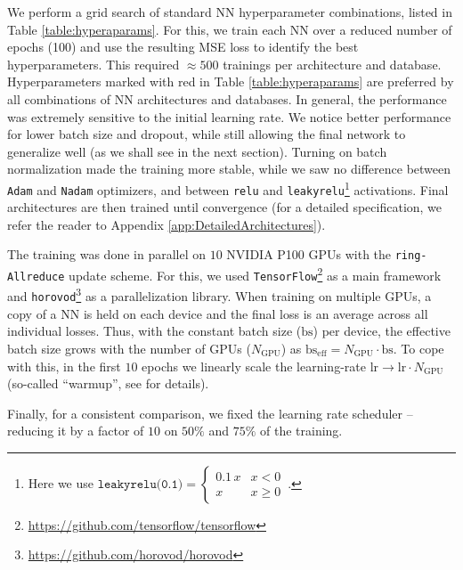 \documentclass[fleqn,usenatbib]{mnras}
\begin{document}
We perform a grid search of standard NN hyperparameter combinations, listed in Table \ref{table:hyperaparams}.  For this, we train each NN over a reduced number of epochs (100) and use the resulting MSE loss to identify the best hyperparameters.  This required $\approx 500$ trainings per architecture and database.  
Hyperparameters marked with red in Table \ref{table:hyperaparams} are preferred by all combinations of NN architectures and databases.
In general, the performance was extremely sensitive to the initial learning rate. We notice better performance for lower batch size and dropout, while still allowing the final network to generalize well (as we shall see in the next section).  Turning on batch normalization made the training more stable, while we saw no difference between \texttt{Adam} and \texttt{Nadam} optimizers, and between \texttt{relu} and \texttt{leakyrelu}\footnote{
Here we use 
$
    \texttt{leakyrelu(0.1)} = \begin{cases}
    0.1 \, x & x < 0\\
    x & x \ge 0
    \end{cases} \, .
$}
activations. Final architectures are then trained until convergence (for a detailed specification, we refer the reader to Appendix \ref{app:DetailedArchitectures}).

The training was done in parallel on $10$ NVIDIA P100 GPUs with the \texttt{ring-Allreduce} update scheme. For this, we used \texttt{TensorFlow}\footnote{\url{https://github.com/tensorflow/tensorflow}} \citep{tensorflow2015-whitepaper} as a main framework and \texttt{horovod}\footnote{\url{https://github.com/horovod/horovod}} \citep{horovod} as a parallelization library. 
When training on multiple GPUs, a copy of a NN is held on each device and the final loss is an average across all individual losses. Thus, with the constant batch size ($\mathrm{bs}$) per device, the effective batch size grows with the number of GPUs ($N_\mathrm{GPU}$) as $\mathrm{bs_{eff}} = N_{\mathrm{GPU}} \cdot \mathrm{bs}$. To cope with this, in the first $10$ epochs we linearly scale the learning-rate $\mathrm{lr} \rightarrow \mathrm{lr} \cdot N_{\mathrm{GPU}}$ (so-called \enquote{warmup}, see \citet{warmup} for details).
 
Finally, for a consistent comparison, we fixed the learning rate scheduler -- reducing it by a factor of $10$ on $50\%$ and $75\%$ of the training.
\end{document}
